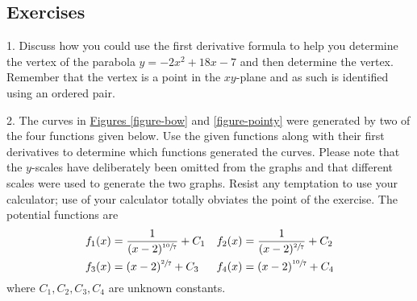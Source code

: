 \documentclass[10pt,oneside,]{book}
\theoremstyle{plain}
\theoremstyle{definition}
\numberwithin{equation}{section}
\newcounter{figstack}
\newlength\fight
\newcommand\pushValignCaptionBottom[5][b]{%
\stepcounter{figstack}%
\expandafter\def\csname %
figalign\romannumeral\value{figstack}\endcsname{#1}%
\expandafter\def\csname %
figtype\romannumeral\value{figstack}\endcsname{#2}%
\expandafter\def\csname %
figwd\romannumeral\value{figstack}\endcsname{#3}%
\expandafter\def\csname %
figcontent\romannumeral\value{figstack}\endcsname{#4}%
\expandafter\def\csname %
figcap\romannumeral\value{figstack}\endcsname{#5}%
\setbox0=\hbox{%
\begin{#2}{#3}#4\end{#2}}%
\ifdim\dimexpr\ht0+\dp0\relax>\fight\global\setlength{\fight}{%
\dimexpr\ht0+\dp0\relax}\fi%
}
\newcommand{\fe}[2]{#1\mathopen{}\left(#2\right)\mathclose{}}
\begin{document}
\subsection[Exercises]{Exercises}\label{exercises-55}
\begin{exerciselist}
\item[1.]\hypertarget{exercise-parabola-vertex}{\null}Discuss how you could use the first derivative formula to help you determine the vertex of the parabola \(y=-2x^2+18x-7\) and then determine the vertex.  Remember that the vertex is a point in the \(xy\)-plane and as such is identified using an ordered pair.%
\par\smallskip
\item[2.]\hypertarget{exercise-distinguish-graphs-by-critical-nature}{\null}The curves in \hyperref[figure-bow]{Figures \ref{figure-bow}} and \hyperref[figure-pointy]{\ref{figure-pointy}} were generated by two of the four functions given below.  Use the given functions along with their first derivatives to determine which functions generated the curves.  Please note that the \(y\)-scales have deliberately been omitted from the graphs and that different scales were used to generate the two graphs.  Resist any temptation to use your calculator; use of your calculator totally obviates the point of the exercise. The potential functions are \begin{align*}
\fe{f_1}{x}&=\frac{1}{(x-2)^{\sfrac{10}{7}}}+C_1&\fe{f_2}{x}&=\frac{1}{(x-2)^{\sfrac{2}{7}}}+C_2\\
\fe{f_3}{x}&=(x-2)^{\sfrac{2}{7}}+C_3&\fe{f_4}{x}&=(x-2)^{\sfrac{10}{7}}+C_4
\end{align*} where \(C_1,C_2,C_3,C_4\) are unknown constants.%
\end{exerciselist}
\end{document}
